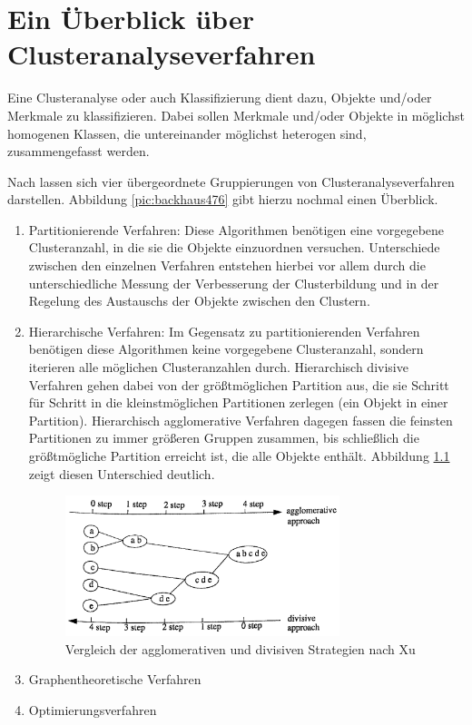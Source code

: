 \chapter{Ein Überblick über Clusteranalyseverfahren}

Eine Clusteranalyse oder auch Klassifizierung dient dazu, Objekte und/oder Merkmale zu klassifizieren. Dabei sollen Merkmale und/oder Objekte in möglichst homogenen Klassen, die untereinander möglichst heterogen sind, zusammengefasst werden.

Nach \citet[S. 476]{Backhaus.2016} lassen sich vier übergeordnete Gruppierungen von Clusteranalyseverfahren darstellen. Abbildung \ref{pic:backhaus476} gibt hierzu nochmal einen Überblick.

\begin{enumerate}
	\item Partitionierende Verfahren: Diese Algorithmen benötigen eine vorgegebene Clusteranzahl, in die sie die Objekte einzuordnen versuchen. Unterschiede zwischen den einzelnen Verfahren entstehen hierbei vor allem durch die unterschiedliche Messung der Verbesserung der Clusterbildung und in der Regelung des Austauschs der Objekte zwischen den Clustern.
	\item Hierarchische Verfahren: Im Gegensatz zu partitionierenden Verfahren benötigen diese Algorithmen keine vorgegebene Clusteranzahl, sondern iterieren alle möglichen Clusteranzahlen durch. Hierarchisch divisive Verfahren gehen dabei von der größtmöglichen Partition aus, die sie Schritt für Schritt in die kleinstmöglichen Partitionen zerlegen (ein Objekt in einer Partition). Hierarchisch agglomerative Verfahren dagegen fassen die feinsten Partitionen zu immer größeren Gruppen zusammen, bis schließlich die größtmögliche Partition erreicht ist, die alle Objekte enthält. Abbildung \ref{pic:xu21} zeigt diesen Unterschied deutlich.
	\begin{figure}[h]
		\begin{center}
			\includegraphics[width=8cm]{pics/xu21.png}
		\end{center}
		\caption{Vergleich der agglomerativen und divisiven Strategien nach Xu}
		\label{pic:xu21}
	\end{figure}
	\item Graphentheoretische Verfahren
	\item Optimierungsverfahren
\end{enumerate}

